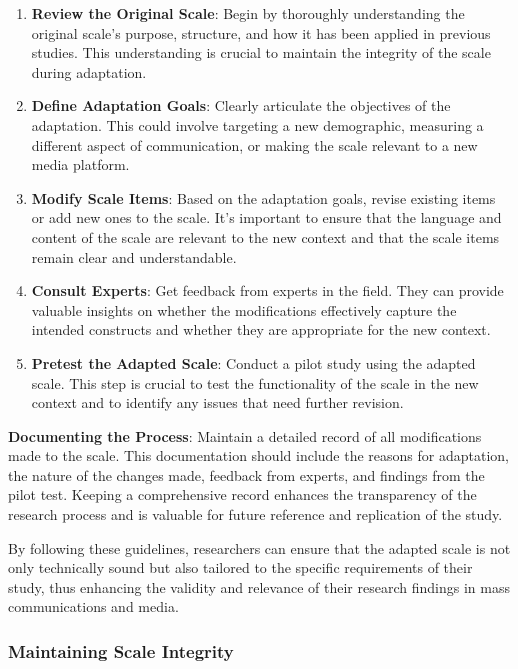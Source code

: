 \documentclass[
]{book}
\providecommand{\tightlist}{%
  \setlength{\itemsep}{0pt}\setlength{\parskip}{0pt}}
\begin{document}
\begin{enumerate}
\def\labelenumi{\arabic{enumi}.}
\tightlist
\item
  \textbf{Review the Original Scale}: Begin by thoroughly understanding the original scale's purpose, structure, and how it has been applied in previous studies. This understanding is crucial to maintain the integrity of the scale during adaptation.
\item
  \textbf{Define Adaptation Goals}: Clearly articulate the objectives of the adaptation. This could involve targeting a new demographic, measuring a different aspect of communication, or making the scale relevant to a new media platform.
\item
  \textbf{Modify Scale Items}: Based on the adaptation goals, revise existing items or add new ones to the scale. It's important to ensure that the language and content of the scale are relevant to the new context and that the scale items remain clear and understandable.
\item
  \textbf{Consult Experts}: Get feedback from experts in the field. They can provide valuable insights on whether the modifications effectively capture the intended constructs and whether they are appropriate for the new context.
\item
  \textbf{Pretest the Adapted Scale}: Conduct a pilot study using the adapted scale. This step is crucial to test the functionality of the scale in the new context and to identify any issues that need further revision.
\end{enumerate}

\textbf{Documenting the Process}: Maintain a detailed record of all modifications made to the scale. This documentation should include the reasons for adaptation, the nature of the changes made, feedback from experts, and findings from the pilot test. Keeping a comprehensive record enhances the transparency of the research process and is valuable for future reference and replication of the study.

By following these guidelines, researchers can ensure that the adapted scale is not only technically sound but also tailored to the specific requirements of their study, thus enhancing the validity and relevance of their research findings in mass communications and media.

\subsubsection*{Maintaining Scale Integrity}\label{maintaining-scale-integrity}
\end{document}
